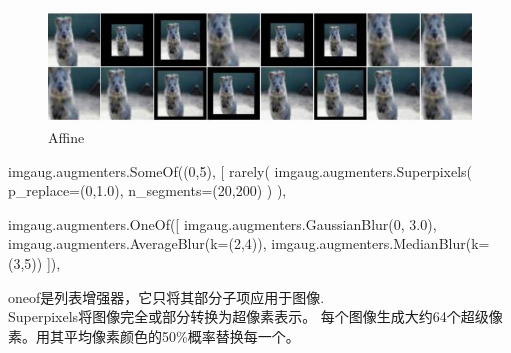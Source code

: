\documentclass[12pt]{report}
\begin{document}
\begin{figure}[h]
 
  \includegraphics[width=.8\textwidth]{A.png} %
  \caption{Affine} %
  \label{img2} %
\end{figure}

\begin{python}

    imgaug.augmenters.SomeOf((0,5),
    [
        rarely(
            imgaug.augmenters.Superpixels(
                p_replace=(0,1.0),
                n_segments=(20,200)
            )
        ),

        imgaug.augmenters.OneOf([
            imgaug.augmenters.GaussianBlur(0, 3.0),
            imgaug.augmenters.AverageBlur(k=(2,4)),
            imgaug.augmenters.MedianBlur(k=(3,5))
        ]),
\end{python}
oneof是列表增强器，它只将其部分子项应用于图像.\\Superpixels将图像完全或部分转换为超像素表示。
每个图像生成大约64个超级像素。用其平均像素颜色的50\%概率替换每一个。
\end{document}
